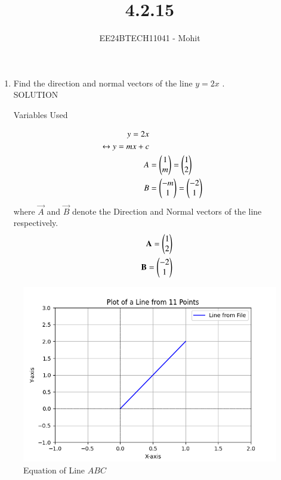 \documentclass[journal]{IEEEtran}
\begin{document}

\vspace{3cm}

\title{4.2.15}
\author{EE24BTECH11041 - Mohit}
{\let\newpage\relax\maketitle}

\renewcommand{\thefigure}{\theenumi}
\renewcommand{\thetable}{\theenumi}
\setlength{\intextsep}{10pt} %


\renewcommand{\thetable}{\theenumi}

\begin{enumerate}
\item Find the direction and normal vectors of the line $y=2x$ . \\
SOLUTION
\begin{table}[h!]    
  \centering
  
  \caption{Variables Used}
  \label{tab 1.4.9.2}
\end{table}
\begin{align}
	y = 2x \\
	\leftrightarrow y = mx + c \\
	A &= \begin{pmatrix}1 \\ m\end{pmatrix} = \begin{pmatrix}1 \\ 2\end{pmatrix} \\
	B &= \begin{pmatrix} -m \\ 1 \end{pmatrix} = \begin{pmatrix} -2 \\ 1 \end{pmatrix} 
\end{align}
where $\vec{A}$ and $\vec{B}$ denote the Direction and Normal vectors of the line respectively.
\begin{align}
	\mathbf{A} = \begin{pmatrix} 1 \\ 2\end{pmatrix} \\
	\mathbf{B} = \begin{pmatrix} -2 \\ 1\end{pmatrix} 
\end{align}
\end{enumerate}
\begin{figure}[h!]
   \centering
   \includegraphics[width=0.7\linewidth]{figs/Figure_1.png}
   \caption{Equation of Line  $ABC$}
   \label{stemplot}
\end{figure}
\end{document}

